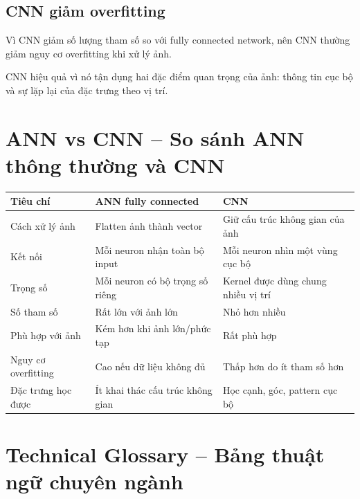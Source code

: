 \subsection{CNN giảm overfitting}

Vì CNN giảm số lượng tham số so với fully connected network, nên CNN thường giảm nguy cơ overfitting khi xử lý ảnh.

\begin{ghinho}
CNN hiệu quả vì nó tận dụng hai đặc điểm quan trọng của ảnh: thông tin cục bộ và sự lặp lại của đặc trưng theo vị trí.
\end{ghinho}

\section{ANN vs CNN -- So sánh ANN thông thường và CNN}

\begin{center}
\begin{tabular}{p{}p{}p{}}
\toprule
Tiêu chí & ANN fully connected & CNN \\
\midrule
Cách xử lý ảnh & Flatten ảnh thành vector & Giữ cấu trúc không gian của ảnh \\
Kết nối & Mỗi neuron nhận toàn bộ input & Mỗi neuron nhìn một vùng cục bộ \\
Trọng số & Mỗi neuron có bộ trọng số riêng & Kernel được dùng chung nhiều vị trí \\
Số tham số & Rất lớn với ảnh lớn & Nhỏ hơn nhiều \\
Phù hợp với ảnh & Kém hơn khi ảnh lớn/phức tạp & Rất phù hợp \\
Nguy cơ overfitting & Cao nếu dữ liệu không đủ & Thấp hơn do ít tham số hơn \\
Đặc trưng học được & Ít khai thác cấu trúc không gian & Học cạnh, góc, pattern cục bộ \\
\bottomrule
\end{tabular}
\end{center}

\section{Technical Glossary -- Bảng thuật ngữ chuyên ngành}


